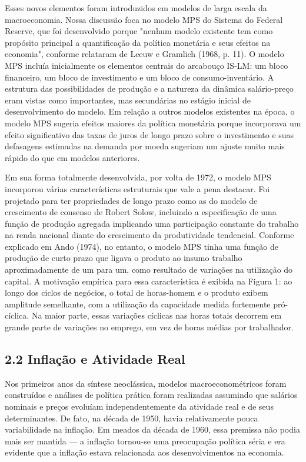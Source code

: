 \documentclass[12pt]{article}
\begin{document}
Esses novos elementos foram introduzidos em modelos de larga escala da macroeconomia. Nossa discussão foca no modelo MPS do Sistema do Federal Reserve, que foi desenvolvido porque "nenhum modelo existente tem como propósito principal a quantificação da política monetária e seus efeitos na economia", conforme relataram de Leeuw e Gramlich (1968, p. 11). O modelo MPS incluía inicialmente os elementos centrais do arcabouço IS-LM: um bloco financeiro, um bloco de investimento e um bloco de consumo-inventário. A estrutura das possibilidades de produção e a natureza da dinâmica salário-preço eram vistas como importantes, mas secundárias no estágio inicial de desenvolvimento do modelo. Em relação a outros modelos existentes na época, o modelo MPS sugeria efeitos maiores da política monetária porque incorporava um efeito significativo das taxas de juros de longo prazo sobre o investimento e suas defasagens estimadas na demanda por moeda sugeriam um ajuste muito mais rápido do que em modelos anteriores.

Em sua forma totalmente desenvolvida, por volta de 1972, o modelo MPS incorporou várias características estruturais que vale a pena destacar. Foi projetado para ter propriedades de longo prazo como as do modelo de crescimento de consenso de Robert Solow, incluindo a especificação de uma função de produção agregada implicando uma participação constante do trabalho na renda nacional diante do crescimento da produtividade tendencial. Conforme explicado em Ando (1974), no entanto, o modelo MPS tinha uma função de produção de curto prazo que ligava o produto ao insumo trabalho aproximadamente de um para um, como resultado de variações na utilização do capital. A motivação empírica para essa característica é exibida na Figura 1: ao longo dos ciclos de negócios, o total de horas-homem e o produto exibem amplitude semelhante, com a utilização da capacidade medida fortemente pró-cíclica. Na maior parte, essas variações cíclicas nas horas totais decorrem em grande parte de variações no emprego, em vez de horas médias por trabalhador.

\subsection{2.2 Inflação e Atividade Real}

Nos primeiros anos da síntese neoclássica, modelos macroeconométricos foram construídos e análises de política prática foram realizadas assumindo que salários nominais e preços evoluíam independentemente da atividade real e de seus determinantes. De fato, na década de 1950, havia relativamente pouca variabilidade na inflação. Em meados da década de 1960, essa premissa não podia mais ser mantida — a inflação tornou-se uma preocupação política séria e era evidente que a inflação estava relacionada aos desenvolvimentos na economia.
\end{document}
